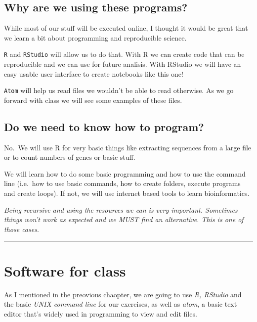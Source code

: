 \documentclass[
]{book}
\begin{document}
\hypertarget{why-are-we-using-these-programs}{%
\section{Why are we using these programs?}\label{why-are-we-using-these-programs}}

While most of our stuff will be executed online, I thought it would be great that we learn a bit about programming and reproducible science.

\texttt{R} and \texttt{RStudio} will allow us to do that. With R we can create code that can be reproducible and we can use for future analisis. With RStudio we will have an easy usable user interface to create notebooks like this one!

\texttt{Atom} will help us read files we wouldn't be able to read otherwise. As we go forward with class we will see some examples of these files.

\hypertarget{do-we-need-to-know-how-to-program}{%
\section{Do we need to know how to program?}\label{do-we-need-to-know-how-to-program}}

No.~We will use R for very basic things like extracting sequences from a large file or to count numbers of genes or basic stuff.

We will learn how to do some basic programming and how to use the command line (i.e.~how to use basic commands, how to create folders, execute programs and create loops). If not, we will use internet based tools to learn bioinformatics.

\emph{Being recursive and using the resources we can is very important. Sometimes things won't work as expected and we MUST find an alternative. This is one of those cases}.

\begin{center}\rule{0.5\linewidth}{0.5pt}\end{center}

\hypertarget{software}{%
\chapter{Software for class}\label{software}}

As I mentioned in the preovious chaopter, we are going to use \emph{R, RStudio} and the basic \emph{UNIX command line} for our exercises, as well as \emph{atom}, a basic text editor that's widely used in programming to view and edit files.
\end{document}
